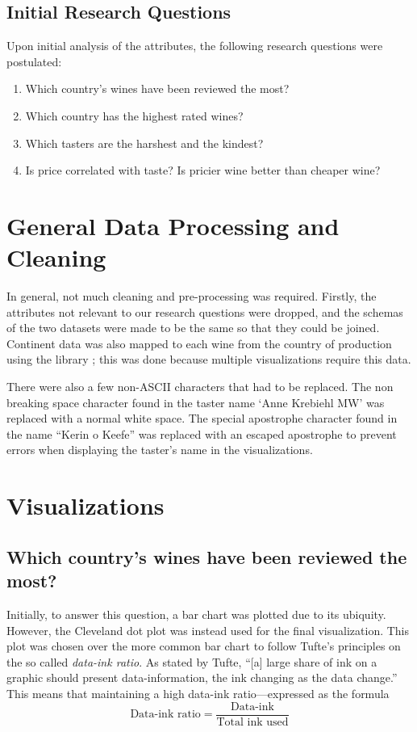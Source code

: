 \subsection{Initial Research Questions}
Upon initial analysis of the attributes, the following research questions were postulated:
\begin{enumerate}
    \setlength\itemsep{0.1em}
    \item Which country's wines have been reviewed the most?
    \item Which country has the highest rated wines?
    \item Which tasters are the harshest and the kindest?
    \item Is price correlated with taste? Is pricier wine better than cheaper wine?
\end{enumerate}

\section{General Data Processing and Cleaning}
In general, not much cleaning and pre-processing was required. Firstly, the attributes not relevant to our research questions were dropped, and the schemas of the two datasets were made to be the same so that they could be joined. Continent data was also mapped to each wine from the country of production using the library ; this was done because multiple visualizations require this data.

There were also a few non-ASCII characters that had to be replaced. The non breaking space character found in the taster name `Anne Krebiehl MW' was replaced with a normal white space. The special apostrophe character found in the name ``Kerin o \textquotesingle Keefe'' was replaced with an escaped apostrophe to prevent errors when displaying the taster's name in the visualizations.

\section{Visualizations}

\subsection{Which country's wines have been reviewed the most?}
Initially, to answer this question, a bar chart was plotted due to its ubiquity. However, the Cleveland dot plot was instead used for the final visualization. This plot was chosen over the more common bar chart to follow Tufte's principles on the so called \emph{data-ink ratio}. As stated by Tufte, ``[a] large share of ink on a graphic should present data-information, the ink changing as the data change.'' This means that maintaining a high data-ink ratio---expressed as the formula
$$
\textrm{Data-ink ratio} = \frac{\textrm{Data-ink}}{\textrm{Total ink used}}
$$

